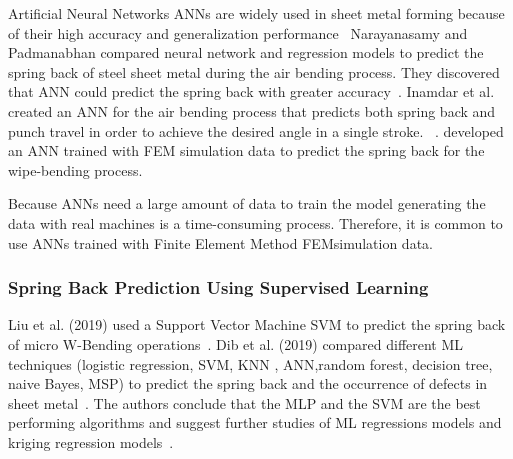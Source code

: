 Artificial Neural Networks \ac{ANN}s are widely used in sheet metal forming because of
their high accuracy and generalization performance~\cite[p. 2]{cruz_applicationmachinelearning_2021}
Narayanasamy and Padmanabhan compared neural network and regression models to predict the spring back of steel sheet
metal during the air bending process.
They discovered that ANN could predict the spring back with greater
accuracy~\cite{narayanasamy_comparisonregressionartificial_2012a}.
Inamdar et al. created an ANN for the air bending process that predicts both spring back and punch travel in order to
achieve the desired angle in a single stroke.
~\cite{inamdar_developmentartificialneural_2000}.
\cite[]{kazan_predictionspringbackwipebending_2009} developed an ANN trained with FEM
simulation data to predict the spring back for the wipe-bending process.

Because \ac{ANN}s need a large amount of data to train the model generating the data
with real
machines is a time-consuming process.
Therefore, it is common to use \ac{ANN}s trained with Finite Element Method \ac{FEM}simulation data.

\subsubsection*{Spring Back Prediction Using Supervised Learning}
Liu et al. (2019) used a Support Vector Machine \ac{SVM} to predict the spring back of
micro W-Bending operations~\cite{liu_springbackpredictionforming_2019}.
Dib et al. (2019) compared different \ac{ML} techniques (logistic regression, SVM, KNN
, ANN,random forest, decision tree, naive Bayes, MSP) to predict the spring back and the occurrence of
defects in sheet metal~\cite[p. 1]{dib_singleensembleclassifiers_2020}.
The authors conclude that the MLP and the SVM are the best performing algorithms and
suggest further studies of ML regressions models and kriging regression
models~\cite[p. 13]{dib_singleensembleclassifiers_2020}.

